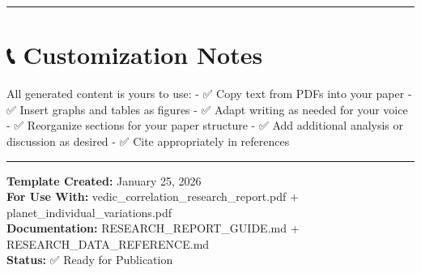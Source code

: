 \documentclass[
  11pt,
  oneside,
  openany]{scrbook}
\begin{document}
\begin{center}\rule{0.5\linewidth}{0.5pt}\end{center}

\section{📞 Customization Notes}\label{customization-notes}

All generated content is yours to use: - ✅ Copy text from PDFs into
your paper - ✅ Insert graphs and tables as figures - ✅ Adapt writing
as needed for your voice - ✅ Reorganize sections for your paper
structure - ✅ Add additional analysis or discussion as desired - ✅
Cite appropriately in references

\begin{center}\rule{0.5\linewidth}{0.5pt}\end{center}

\textbf{Template Created:} January 25, 2026\\
\textbf{For Use With:} vedic\_correlation\_research\_report.pdf +
planet\_individual\_variations.pdf\\
\textbf{Documentation:} RESEARCH\_REPORT\_GUIDE.md +
RESEARCH\_DATA\_REFERENCE.md\\
\textbf{Status:} ✅ Ready for Publication


\backmatter
\end{document}
